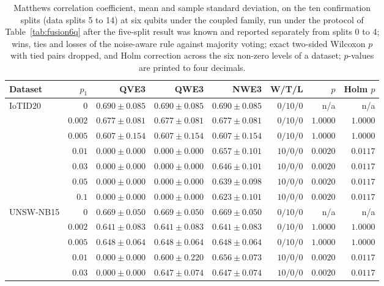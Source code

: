 \begin{table}[t]
\centering
\caption{Matthews correlation coefficient, mean and sample standard deviation, on the ten
confirmation splits (data splits 5 to 14) at six qubits under the coupled family,
run under the protocol of Table~\ref{tab:fusion6q} after the five-split result was known
and reported separately from splits 0 to 4; wins, ties and losses of the noise-aware rule against majority voting; exact
two-sided Wilcoxon $p$ with tied pairs dropped, and Holm correction across the six
non-zero levels of a dataset; $p$-values are printed to four decimals.}
\label{tab:s1splits}
\footnotesize
\setlength{\tabcolsep}{3pt}
\begin{tabular}{@{}lrrrrrrr@{}}
\toprule
Dataset & $p_1$ & QVE3 & QWE3 & NWE3 & W/T/L & $p$ & Holm $p$ \\
\midrule
\multirow{7}{*}{IoTID20}
 & $0$ & $0.690 \pm 0.085$ & $0.690 \pm 0.085$ & $0.690 \pm 0.085$ & $0/10/0$ & n/a & n/a \\
 & $0.002$ & $0.677 \pm 0.081$ & $0.677 \pm 0.081$ & $0.677 \pm 0.081$ & $0/10/0$ & $1.0000$ & $1.0000$ \\
 & $0.005$ & $0.607 \pm 0.154$ & $0.607 \pm 0.154$ & $0.607 \pm 0.154$ & $0/10/0$ & $1.0000$ & $1.0000$ \\
 & $0.01$ & $0.000 \pm 0.000$ & $0.000 \pm 0.000$ & $0.657 \pm 0.101$ & $10/0/0$ & $0.0020$ & $0.0117$ \\
 & $0.03$ & $0.000 \pm 0.000$ & $0.000 \pm 0.000$ & $0.646 \pm 0.101$ & $10/0/0$ & $0.0020$ & $0.0117$ \\
 & $0.05$ & $0.000 \pm 0.000$ & $0.000 \pm 0.000$ & $0.639 \pm 0.098$ & $10/0/0$ & $0.0020$ & $0.0117$ \\
 & $0.1$ & $0.000 \pm 0.000$ & $0.000 \pm 0.000$ & $0.623 \pm 0.101$ & $10/0/0$ & $0.0020$ & $0.0117$ \\
\midrule
\multirow{7}{*}{UNSW-NB15}
 & $0$ & $0.669 \pm 0.050$ & $0.669 \pm 0.050$ & $0.669 \pm 0.050$ & $0/10/0$ & n/a & n/a \\
 & $0.002$ & $0.641 \pm 0.083$ & $0.641 \pm 0.083$ & $0.641 \pm 0.083$ & $0/10/0$ & $1.0000$ & $1.0000$ \\
 & $0.005$ & $0.648 \pm 0.064$ & $0.648 \pm 0.064$ & $0.648 \pm 0.064$ & $0/10/0$ & $1.0000$ & $1.0000$ \\
 & $0.01$ & $0.000 \pm 0.000$ & $0.600 \pm 0.220$ & $0.656 \pm 0.073$ & $10/0/0$ & $0.0020$ & $0.0117$ \\
 & $0.03$ & $0.000 \pm 0.000$ & $0.647 \pm 0.074$ & $0.647 \pm 0.074$ & $10/0/0$ & $0.0020$ & $0.0117$ \\

\end{tabular}
\end{table}
